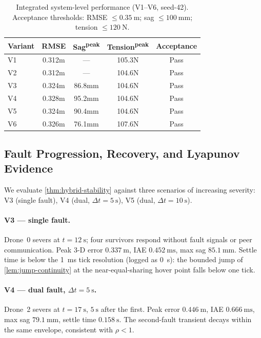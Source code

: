 \documentclass[lettersize,journal]{IEEEtran}
\begin{document}
\begin{table}[htbp]
  \caption{Integrated system-level performance (V1--V6, seed-42). Acceptance thresholds: RMSE $\le \SI{0.35}{\metre}$; sag $\le \SI{100}{\milli\metre}$; tension $\le \SI{120}{\newton}$.}
  \label{tab:performance-ci}
  \centering
  \small
  \renewcommand{\arraystretch}{1.05}
  \begin{tabular}{lcccc}
    \toprule
    Variant & RMSE & Sag\textsuperscript{peak}
            & Tension\textsuperscript{peak} & Acceptance \\
    \midrule
    V1 & 0.312m & ---  & 105.3N & Pass \\
    V2 & 0.312m & ---  & 104.6N & Pass \\
    V3 & 0.324m & 86.8mm & 104.6N & Pass \\
    V4 & 0.328m & 95.2mm & 104.6N & Pass \\
    V5 & 0.324m & 90.4mm & 104.6N & Pass \\
    V6 & 0.326m & 76.1mm & 107.6N & Pass \\
    \bottomrule
  \end{tabular}
\end{table}

\subsection{Fault Progression, Recovery, and Lyapunov Evidence}
\label{sec:VI-C}

We evaluate \cref{thm:hybrid-stability} against three scenarios of increasing severity: V3 (single fault), V4 (dual, $\Delta t = \SI{5}{\second}$), V5 (dual, $\Delta t = \SI{10}{\second}$).

\paragraph{V3 --- single fault.} Drone~0 severs at $t = \SI{12}{\second}$; four survivors respond without fault signals or peer communication. Peak 3-D error $\SI{0.337}{\metre}$, IAE $\SI{0.452}{\metre\second}$, max sag $\SI{85.1}{\milli\metre}$. Settle time is below the \SI{1}{\milli\second} tick resolution (logged as 0~s): the bounded jump of \cref{lem:jump-continuity} at the near-equal-sharing hover point falls below one tick.

\paragraph{V4 --- dual fault, $\Delta t = \SI{5}{\second}$.} Drone~2 severs at $t = \SI{17}{\second}$, $\SI{5}{\second}$ after the first. Peak error $\SI{0.446}{\metre}$, IAE $\SI{0.666}{\metre\second}$, max sag $\SI{79.1}{\milli\metre}$, settle time $\SI{0.158}{\second}$. The second-fault transient decays within the same envelope, consistent with $\rho < 1$.
\end{document}
